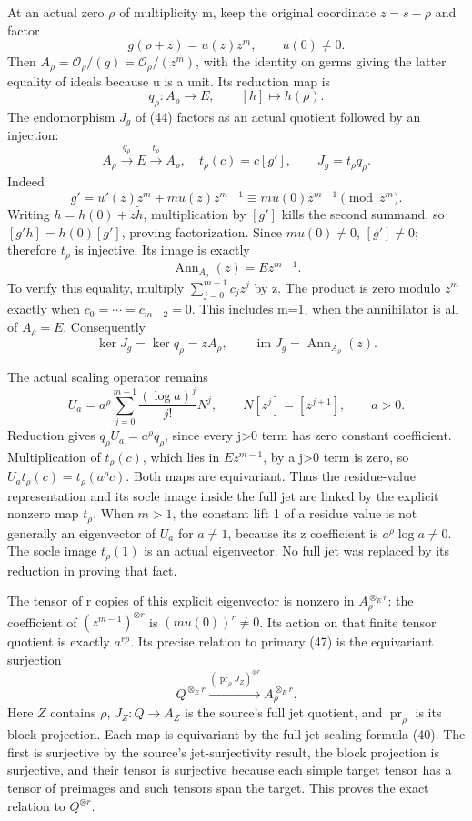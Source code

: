\documentclass[10pt,a4paper,oneside]{report}
\begin{document}
At an actual zero \(\rho\) of multiplicity m, keep the original coordinate \(z=s-\rho\) and factor \[
g(\rho+z)=u(z)z^m,\qquad u(0)\ne0.
\] Then \(A_\rho=\mathcal O_\rho/(g)=\mathcal O_\rho/(z^m)\), with the identity on germs giving the latter equality of ideals because u is a unit. Its reduction map is \[
q_\rho:A_\rho\longrightarrow E,\qquad [h]\longmapsto h(\rho).
\] The endomorphism \(J_g\) of (44) factors as an actual quotient followed by an injection: \[
A_\rho\xrightarrow{q_\rho}E\xrightarrow{t_\rho}A_\rho,
\quad t_\rho(c)=c[g'],\qquad J_g=t_\rho q_\rho.
\] Indeed \[
g'=u'(z)z^m+m u(z)z^{m-1}
\equiv m u(0)z^{m-1}\pmod{z^m}.
\] Writing \(h=h(0)+z\widetilde h\), multiplication by \([g']\) kills the second summand, so \([g'h]=h(0)[g']\), proving factorization. Since \(m u(0)\ne0\), \([g']\ne0\); therefore \(t_\rho\) is injective. Its image is exactly \[
\operatorname{Ann}_{A_\rho}(z)=E z^{m-1}.
\] To verify this equality, multiply \(\sum_{j=0}^{m-1}c_jz^j\) by z. The product is zero modulo \(z^m\) exactly when \(c_0=\cdots=c_{m-2}=0\). This includes m=1, when the annihilator is all of \(A_\rho=E\). Consequently \[
\ker J_g=\ker q_\rho=zA_\rho,
\qquad\operatorname{im}J_g=\operatorname{Ann}_{A_\rho}(z).
\]

The actual scaling operator remains \[
U_a=a^\rho\sum_{j=0}^{m-1}\frac{(\log a)^j}{j!}N^j,
\qquad N[z^j]=[z^{j+1}],\qquad a>0.
\] Reduction gives \(q_\rho U_a=a^\rho q_\rho\), since every j\textgreater0 term has zero constant coefficient. Multiplication of \(t_\rho(c)\), which lies in \(Ez^{m-1}\), by a j\textgreater0 term is zero, so \(U_at_\rho(c)=t_\rho(a^\rho c)\). Both maps are equivariant. Thus the residue-value representation and its socle image inside the full jet are linked by the explicit nonzero map \(t_\rho\). When \(m>1\), the constant lift 1 of a residue value is not generally an eigenvector of \(U_a\) for \(a\ne1\), because its z coefficient is \(a^\rho\log a\ne0\). The socle image \(t_\rho(1)\) is an actual eigenvector. No full jet was replaced by its reduction in proving that fact.

The tensor of r copies of this explicit eigenvector is nonzero in \(A_\rho^{\otimes_E r}\): the coefficient of \((z^{m-1})^{\otimes r}\) is \((m u(0))^r\ne0\). Its action on that finite tensor quotient is exactly \(a^{r\rho}\). Its precise relation to primary (47) is the equivariant surjection \[
Q^{\otimes_E r}\xrightarrow{(\operatorname{pr}_\rho J_Z)^{\otimes r}}
A_\rho^{\otimes_E r}.
\] Here \(Z\) contains \(\rho\), \(J_Z:Q\to A_Z\) is the source's full jet quotient, and \(\operatorname{pr}_\rho\) is its block projection. Each map is equivariant by the full jet scaling formula (40). The first is surjective by the source's jet-surjectivity result, the block projection is surjective, and their tensor is surjective because each simple target tensor has a tensor of preimages and such tensors span the target. This proves the exact relation to \(Q^{\otimes r}\).
\end{document}
